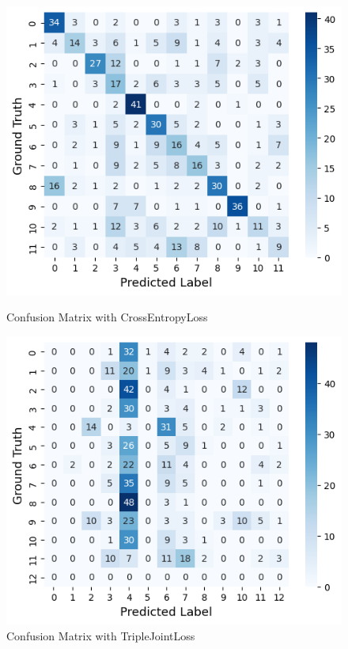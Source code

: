 \documentclass[dvipdfmx]{article}
\begin{document}
\begin{figure}[htbp]
    \begin{minipage}[c]{0.5\hsize}
      \centering
      \includegraphics[width=\linewidth]{./img/conf_crossentropy.png}
      \caption{Confusion Matrix with CrossEntropyLoss}
    \end{minipage}
    \begin{minipage}[c]{0.5\hsize}
      \centering
      \includegraphics[width=\linewidth]{./img/conf_TJL.png}
      \caption{Confusion Matrix with TripleJointLoss}
    \end{minipage}
  \end{figure}
\end{document}
